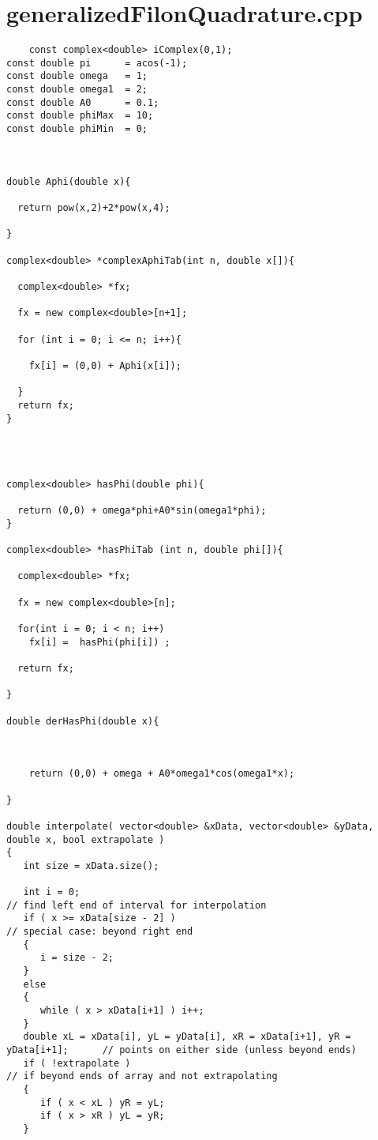 \pagebreak

\section{generalizedFilonQuadrature.cpp}

\begin{lstlisting}
    const complex<double> iComplex(0,1);
const double pi      = acos(-1);
const double omega   = 1;
const double omega1  = 2;
const double A0      = 0.1;
const double phiMax  = 10;
const double phiMin  = 0;



double Aphi(double x){

  return pow(x,2)+2*pow(x,4);

}

complex<double> *complexAphiTab(int n, double x[]){ 

  complex<double> *fx;
  
  fx = new complex<double>[n+1];
  
  for (int i = 0; i <= n; i++){

    fx[i] = (0,0) + Aphi(x[i]);

  }
  return fx;
}




complex<double> hasPhi(double phi){ 
  
  return (0,0) + omega*phi+A0*sin(omega1*phi);
}

complex<double> *hasPhiTab (int n, double phi[]){ 

  complex<double> *fx;

  fx = new complex<double>[n];

  for(int i = 0; i < n; i++)
    fx[i] =  hasPhi(phi[i]) ;

  return fx;

}

double derHasPhi(double x){

  

    return (0,0) + omega + A0*omega1*cos(omega1*x);

}

double interpolate( vector<double> &xData, vector<double> &yData, double x, bool extrapolate )
{
   int size = xData.size();

   int i = 0;                                                                  // find left end of interval for interpolation
   if ( x >= xData[size - 2] )                                                 // special case: beyond right end
   {
      i = size - 2;
   }
   else
   {
      while ( x > xData[i+1] ) i++;
   }
   double xL = xData[i], yL = yData[i], xR = xData[i+1], yR = yData[i+1];      // points on either side (unless beyond ends)
   if ( !extrapolate )                                                         // if beyond ends of array and not extrapolating
   {
      if ( x < xL ) yR = yL;
      if ( x > xR ) yL = yR;
   }


\end{lstlisting}
